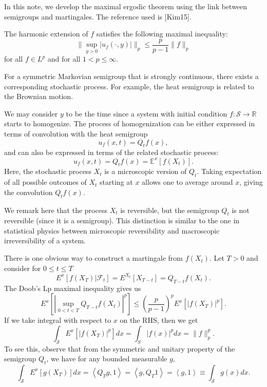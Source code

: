 
In this note, we develop the maximal ergodic theorem using the link between semigroups and martingales. The reference used is [Kim15]. 


\begin{theorem}
	\label{thm:MaximalErgodicThm}
	The harmonic extension of $f$ satisfies the following maximal inequality:
	\[
		\|\sup _{y > 0} \left| u_f(\cdot ,y) \right| \|_p
		\le \frac{p}{p-1} \|f\|_p
	\] 
	for all $f \in L^p$ and for all $1 < p \le \infty $.
\end{theorem}


For a symmetric Markovian semigroup that is strongly continuous, there exists a corresponding stochastic process. For example, the heat semigroup is related to the Brownian motion.

We may consider $y$ to be the time since a system with initial condition $f: \mathcal{S} \to \mathbb{R}$ starts to homogenize. The process of homogenization can be either expressed in terms of convolution with the heat semigroup
\[
	u_f(x, t) = Q_t f(x)
,\] 
and can also be expressed in terms of the related stochastic process:
\[
	u_f(x, t) = Q_t f(x) = \mathbb{E}^x\left[ f(X_t) \right] 
.\] 
Here, the stochastic process $X_t$ is a microscopic version of $Q_t$. Taking expectation of all possible outcomes of $X_t$ starting at $x$ allows one to average around $x$, giving the convolution $Q_t f(x)$.

We remark here that the process $X_t$ is reversible, but the semigroup $Q_t$ is not reversible (since it is a semigroup). This distinction is similar to the one in statistical physics between microscopic reversibility and macroscopic irreversibility of a system.

There is one obvious way to construct a martingale from $f(X_t)$. Let $T>0$ and consider for $0 \le t \le T$
\[
	E^x\left[ f(X_T) | \mathcal{F}_t \right] = E^{X_t}[X_{T - t}] = Q_{T - t} f(X_t)
.\] 
The Doob's Lp maximal inequality gives us
\begin{equation}
	\label{eqn:maximalErgodicDoob}
	E^x\left[ \left| \sup _{0 < t < T} Q_{T - t} f(X_t) \right|^p  \right] 
	\le  \left( \frac{p}{p-1} \right) ^p
	E^x\left[ |f(X_T)|^p \right] 
.\end{equation} 
If we take integral with respect to $x$ on the RHS, then we get
\[
	\int _{\mathcal{S}} E^x \left[ |f(X_T)|^p \right]  d x
	= \int _{S} |f(x)|^p dx = \|f\|_p^p
.\] 
To see this, observe that from the symmetric and unitary property of the semigroup $Q_t$, we have for any bounded measurable $g$,
\begin{equation}
	\label{eqn:semi-expect}
	\int _{\mathcal{S}}E^x\left[ g(X_T) \right]  d x
	= \left\langle Q_T g, 1 \right\rangle 
	= \left\langle g, Q_T 1 \right\rangle 
	= \left\langle g, 1 \right\rangle 
	\equiv \int _{\mathcal{S}}g(x) d x
.\end{equation} 



